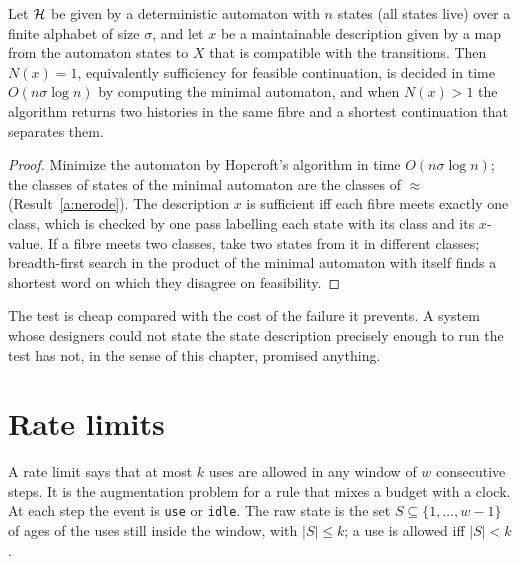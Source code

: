 \begin{newresult}\label{prop:decide-suff}
Let $\mathcal{H}$ be given by a deterministic automaton with $n$ states (all states live) over a finite alphabet of size $\sigma$, and let $x$ be a maintainable description given by a map from the automaton states to $X$ that is compatible with the transitions. Then $N(x)=1$, equivalently sufficiency for feasible continuation, is decided in time $O(n\sigma\log n)$ by computing the minimal automaton, and when $N(x)>1$ the algorithm returns two histories in the same fibre and a shortest continuation that separates them.
\end{newresult}
\begin{proof}
Minimize the automaton by Hopcroft's algorithm in time $O(n\sigma\log n)$; the classes of states of the minimal automaton are the classes of $\approx$ (Result~\ref{a:nerode}). The description $x$ is sufficient iff each fibre meets exactly one class, which is checked by one pass labelling each state with its class and its $x$-value. If a fibre meets two classes, take two states from it in different classes; breadth-first search in the product of the minimal automaton with itself finds a shortest word on which they disagree on feasibility.
\end{proof}

The test is cheap compared with the cost of the failure it prevents. A system whose designers could not state the state description precisely enough to run the test has not, in the sense of this chapter, promised anything.

\section{Rate limits}\label{sec:rate}

A rate limit says that at most $k$ uses are allowed in any window of $w$ consecutive steps. It is the augmentation problem for a rule that mixes a budget with a clock. At each step the event is \texttt{use} or \texttt{idle}. The raw state is the set $S\subseteq\{1,\dots,w-1\}$ of ages of the uses still inside the window, with $|S|\le k$; a use is allowed iff $|S|<k$.

